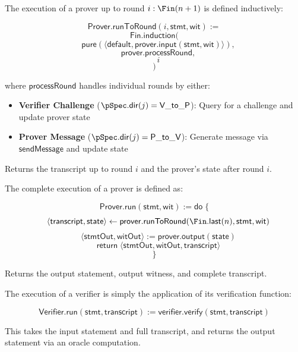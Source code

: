 \begin{definition}
    \label{def:prover_run_to_round}
    The execution of a prover up to round $i : \Fin(n+1)$ is defined inductively:

    \[ \mathsf{Prover}.\mathsf{runToRound}(i, \mathsf{stmt}, \mathsf{wit}) := \]
    \[ \mathsf{Fin}.\mathsf{induction}( \]
    \[ \quad \mathsf{pure}(\langle \mathsf{default}, \mathsf{prover}.\mathsf{input}(\mathsf{stmt}, \mathsf{wit}) \rangle), \]
    \[ \quad \mathsf{prover}.\mathsf{processRound}, \]
    \[ \quad i \]
    \[ ) \]

    where $\mathsf{processRound}$ handles individual rounds by either:
    \begin{itemize}
        \item \textbf{Verifier Challenge} ($\pSpec.\mathsf{dir}(j) = \mathsf{V\_to\_P}$): Query for a challenge and update prover state
        \item \textbf{Prover Message} ($\pSpec.\mathsf{dir}(j) = \mathsf{P\_to\_V}$): Generate message via $\mathsf{sendMessage}$ and update state
    \end{itemize}

    Returns the transcript up to round $i$ and the prover's state after round $i$.
\end{definition}

\begin{definition}
    \label{def:prover_run}
    The complete execution of a prover is defined as:

    \[ \mathsf{Prover}.\mathsf{run}(\mathsf{stmt}, \mathsf{wit}) := \mathsf{do} \; \{ \]
    \[ \quad \langle \mathsf{transcript}, \mathsf{state} \rangle \leftarrow \mathsf{prover}.\mathsf{runToRound}(\Fin.\mathsf{last}(n), \mathsf{stmt}, \mathsf{wit}) \]
    \[ \quad \langle \mathsf{stmtOut}, \mathsf{witOut} \rangle := \mathsf{prover}.\mathsf{output}(\mathsf{state}) \]
    \[ \quad \mathsf{return} \; \langle \mathsf{stmtOut}, \mathsf{witOut}, \mathsf{transcript} \rangle \]
    \[ \} \]

    Returns the output statement, output witness, and complete transcript.
\end{definition}

\begin{definition}
    \label{def:verifier_run}
    The execution of a verifier is simply the application of its verification function:

    \[ \mathsf{Verifier}.\mathsf{run}(\mathsf{stmt}, \mathsf{transcript}) := \mathsf{verifier}.\mathsf{verify}(\mathsf{stmt}, \mathsf{transcript}) \]

    This takes the input statement and full transcript, and returns the output statement via an oracle computation.
\end{definition}

